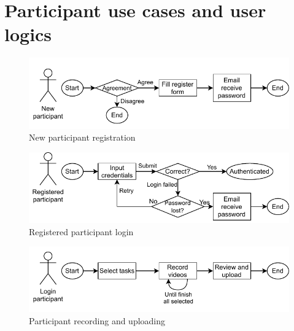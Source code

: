 \section{Participant use cases and user logics}
\label{sec:Participant use cases and user logics}

\begin{figure}[!ht]
    \centering
    \includegraphics[width=\textwidth]{implementation/imgs/4-webapp-user-register.pdf}
    \caption{New participant registration}
    \label{fig:4-webapp-user-register}
\end{figure}

\begin{figure}[!ht]
    \centering
    \includegraphics[width=\textwidth]{implementation/imgs/4-webapp-user-login.pdf}
    \caption{Registered participant login}
    \label{fig:4-webapp-user-login}
\end{figure}

\begin{figure}[!ht]
    \centering
    \includegraphics[width=\textwidth]{implementation/imgs/4-webapp-user-record.pdf}
    \caption{Participant recording and uploading}
    \label{fig:4-webapp-user-record}
\end{figure}
